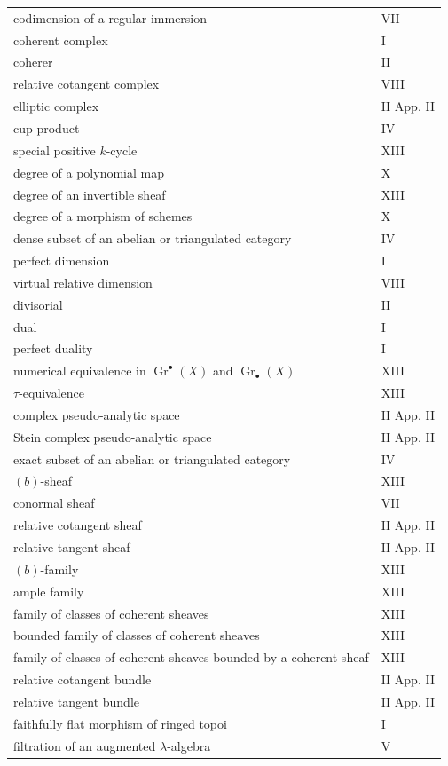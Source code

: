 \documentclass[11pt]{article}
\theoremstyle{plain}
\theoremstyle{definition}
\theoremstyle{remark}
\DeclareMathOperator{\Gr}{Gr}
\begin{document}
\begin{longtable}{p{8.5cm}l}
codimension of a regular immersion & VII\\
coherent complex & I\\
coherer & II\\
relative cotangent complex & VIII\\
elliptic complex & II App. II\\
cup-product & IV\\
special positive $k$-cycle & XIII\\
degree of a polynomial map & X\\
degree of an invertible sheaf & XIII\\
degree of a morphism of schemes & X\\
dense subset of an abelian or triangulated category & IV\\
perfect dimension & I\\
virtual relative dimension & VIII\\
divisorial & II\\
dual & I\\
perfect duality & I\\
numerical equivalence in $\Gr^\bullet(X)$ and $\Gr_\bullet(X)$ & XIII\\
$\tau$-equivalence & XIII\\
complex pseudo-analytic space & II App. II\\
Stein complex pseudo-analytic space & II App. II\\
exact subset of an abelian or triangulated category & IV\\
$(b)$-sheaf & XIII\\
conormal sheaf & VII\\
relative cotangent sheaf & II App. II\\
relative tangent sheaf & II App. II\\
$(b)$-family & XIII\\
ample family & XIII\\
family of classes of coherent sheaves & XIII\\
bounded family of classes of coherent sheaves & XIII\\
family of classes of coherent sheaves bounded by a coherent sheaf & XIII\\
relative cotangent bundle & II App. II\\
relative tangent bundle & II App. II\\
faithfully flat morphism of ringed topoi & I\\
filtration of an augmented $\lambda$-algebra & V\\

\end{longtable}
\end{document}
